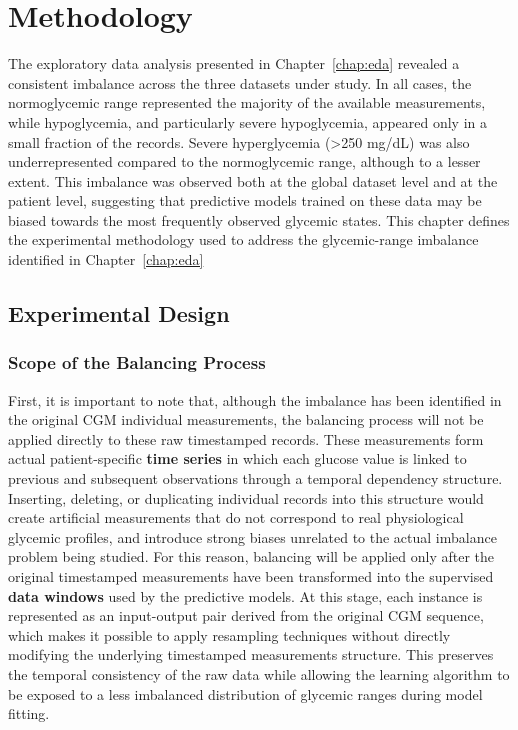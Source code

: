 
\chapter{Methodology}
\label{chap:experimental_methodology}

The exploratory data analysis presented in Chapter~\ref{chap:eda} revealed a consistent imbalance across the three datasets under study. In all cases, the normoglycemic range represented the majority of the available measurements, while hypoglycemia, and particularly severe hypoglycemia, appeared only in a small fraction of the records. Severe hyperglycemia (>250 mg/dL) was also underrepresented compared to the normoglycemic range, although to a lesser extent. This imbalance was observed both at the global dataset level and at the patient level, suggesting that predictive models trained on these data may be biased towards the most frequently observed glycemic states. This chapter defines the experimental methodology used to address the glycemic-range imbalance identified in Chapter~\ref{chap:eda}

\section{Experimental Design}
\label{sec:experimental_methodology_proposal}

\subsection{Scope of the Balancing Process}
\label{subsec:experimental_methodology_scope}

First, it is important to note that, although the imbalance has been identified in the original CGM individual measurements, the balancing process will not be applied directly to these raw timestamped records. These measurements form actual patient-specific \textbf{time series} in which each glucose value is linked to previous and subsequent observations through a temporal dependency structure. Inserting, deleting, or duplicating individual records into this structure would create artificial measurements that do not correspond to real physiological glycemic profiles, and introduce strong biases unrelated to the actual imbalance problem being studied. For this reason, balancing will be applied only after the original timestamped measurements have been transformed into the supervised \textbf{data windows} used by the predictive models. At this stage, each instance is represented as an input-output pair derived from the original CGM sequence, which makes it possible to apply resampling techniques without directly modifying the underlying timestamped measurements structure. This preserves the temporal consistency of the raw data while allowing the learning algorithm to be exposed to a less imbalanced distribution of glycemic ranges during model fitting.

